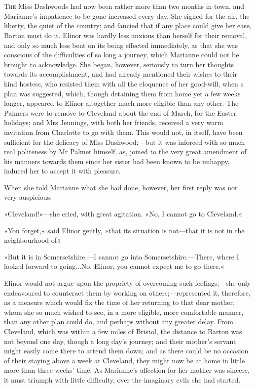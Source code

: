 \chapter[Chapter \thechapter]{}
\lettrine[lines=4,lraise=0.3]{T}{he} Miss Dashwoods had now been rather more than two months in town, and Marianne’s impatience to be gone increased every day. She sighed for the air, the liberty, the quiet of the country; and fancied that if any place could give her ease, Barton must do it. Elinor was hardly less anxious than herself for their removal, and only so much less bent on its being effected immediately, as that she was conscious of the difficulties of so long a journey, which Marianne could not be brought to acknowledge. She began, however, seriously to turn her thoughts towards its accomplishment, and had already mentioned their wishes to their kind hostess, who resisted them with all the eloquence of her good-will, when a plan was suggested, which, though detaining them from home yet a few weeks longer, appeared to Elinor altogether much more eligible than any other. The Palmers were to remove to Cleveland about the end of March, for the Easter holidays; and Mrs Jennings, with both her friends, received a very warm invitation from Charlotte to go with them. This would not, in itself, have been sufficient for the delicacy of Miss Dashwood;—but it was inforced with so much real politeness by Mr Palmer himself, as, joined to the very great amendment of his manners towards them since her sister had been known to be unhappy, induced her to accept it with pleasure.

When she told Marianne what she had done, however, her first reply was not very auspicious.

»Cleveland!«—she cried, with great agitation. »No, I cannot go to Cleveland.«

»You forget,« said Elinor gently, »that its situation is not—that it is not in the neighbourhood of\longdash«

»But it is in Somersetshire.—I cannot go into Somersetshire.—There, where I looked forward to going...No, Elinor, you cannot expect me to go there.«

Elinor would not argue upon the propriety of overcoming such feelings;—she only endeavoured to counteract them by working on others;—represented it, therefore, as a measure which would fix the time of her returning to that dear mother, whom she so much wished to see, in a more eligible, more comfortable manner, than any other plan could do, and perhaps without any greater delay. From Cleveland, which was within a few miles of Bristol, the distance to Barton was not beyond one day, though a long day’s journey; and their mother’s servant might easily come there to attend them down; and as there could be no occasion of their staying above a week at Cleveland, they might now be at home in little more than three weeks’ time. As Marianne’s affection for her mother was sincere, it must triumph with little difficulty, over the imaginary evils she had started.

